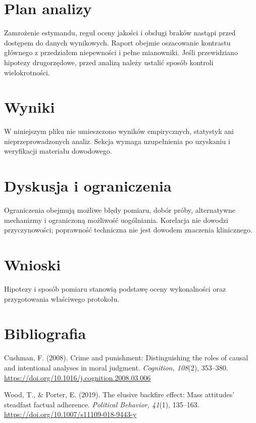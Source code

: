 \documentclass[11pt,a4paper]{article}
\begin{document}
\section{Plan analizy}

Zamrożenie estymandu, reguł oceny jakości i obsługi braków nastąpi przed dostępem do danych wynikowych. Raport obejmie oszacowanie kontrastu głównego z przedziałem niepewności i pełne mianowniki. Jeśli przewidziano hipotezy drugorzędowe, przed analizą należy ustalić sposób kontroli wielokrotności.

\section{Wyniki}

W niniejszym pliku nie umieszczono wyników empirycznych, statystyk ani nieprzeprowadzonych analiz. Sekcja wymaga uzupełnienia po uzyskaniu i weryfikacji materiału dowodowego.

\section{Dyskusja i ograniczenia}

Ograniczenia obejmują możliwe błędy pomiaru, dobór próby, alternatywne mechanizmy i ograniczoną możliwość uogólniania. Korelacja nie dowodzi przyczynowości; poprawność techniczna nie jest dowodem znaczenia klinicznego.

\section{Wnioski}

Hipotezy i sposób pomiaru stanowią podstawę oceny wykonalności oraz przygotowania właściwego protokołu.

\section*{Bibliografia}

{\setlength{\parindent}{0pt}
\setlength{\parskip}{5pt}
\hangindent=1.27cm
Cushman, F. (2008). Crime and punishment: Distinguishing the roles of causal and intentional analyses in moral judgment. \textit{Cognition, 108}(2), 353--380. \url{https://doi.org/10.1016/j.cognition.2008.03.006}\par
\hangindent=1.27cm
Wood, T., \& Porter, E. (2019). The elusive backfire effect: Mass attitudes’ steadfast factual adherence. \textit{Political Behavior, 41}(1), 135--163. \url{https://doi.org/10.1007/s11109-018-9443-y}\par
}
\end{document}
